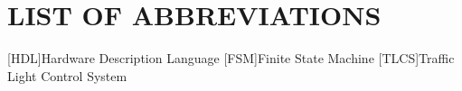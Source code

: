 \documentclass[12pt,a4paper]{article}
\begin{document}
\section*{LIST OF ABBREVIATIONS}
\begin{acronym}[TLCS]\itemsep0pt
	[HDL]{Hardware Description Language}
	[FSM]{Finite State Machine}
	[TLCS]{Traffic Light Control System}
\end{acronym}

\clearpage
\fancyhead[L]{\footnotesize\textsl{\nouppercase\leftmark}}
\titleformat{\section}{\normalfont\Large\bfseries}{\thesection}{1em}{}
\onehalfspacing{}
\clearpage

\clearpage

\clearpage

\clearpage

\clearpage

\clearpage

\clearpage


\clearpage
{}
\fancyhead{}
\fancyhead[L]{\footnotesize\textsl{\nouppercase\rightmark}}

\clearpage
\fancyhead{}
\fancyhead[L]{\footnotesize\textsl{\nouppercase\leftmark}}
\begin{flushleft}
	\singlespacing{}
	\setlength{\bibitemsep}{\baselineskip}
	\titleformat{\section}{\normalfont\Large\bfseries\centering}{\thesection}{1em}{}
	\renewcommand{\refname}{REFERENCES}
	\printbibliography{}
\end{flushleft}
\end{document}
